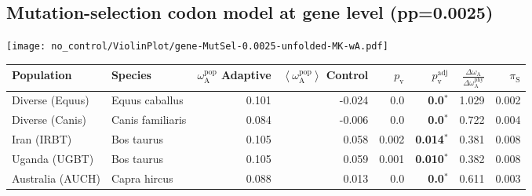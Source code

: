 \subsection{Mutation-selection codon model at gene level (pp=0.0025)}
\begin{center}
\texttt{[image: no\_control/ViolinPlot/gene-MutSel-0.0025-unfolded-MK-wA.pdf]}
\begin{adjustbox}{width = 1\textwidth}
\begin{tabular}{|l|l|r|r|r|r|r|r|}
\toprule
                     Population &              Species & \specialcell{$\omega_{\mathrm{A}}^{\mathrm{pop}}$ \\ Adaptive} & \specialcell{$\left< \omega_{\mathrm{A}}^{\mathrm{pop}} \right>$ \\ Control} & $p_{\mathrm{v}}$ & $p_{\mathrm{v}}^{\mathrm{adj}}$ & $\frac{\Delta\omega_{\mathrm{A}}}{\Delta\omega_{\mathrm{A}}^{\mathrm{phy}}}$ & $\pi_{\textrm{S}}$ \\
\midrule
                Diverse (Equus) &       Equus caballus &                                              0.101 &                                             -0.024 &              0.0 &                    \textbf{0.0}$\bm{^*}$ &                                              1.029 &              0.002 \\
                Diverse (Canis) &     Canis familiaris &                                              0.084 &                                             -0.006 &              0.0 &                    \textbf{0.0}$\bm{^*}$ &                                              0.722 &              0.004 \\
                    Iran (IRBT) &           Bos taurus &                                              0.105 &                                              0.058 &            0.002 &                  \textbf{0.014}$\bm{^*}$ &                                              0.381 &              0.008 \\
                  Uganda (UGBT) &           Bos taurus &                                              0.105 &                                              0.059 &            0.001 &                  \textbf{0.010}$\bm{^*}$ &                                              0.382 &              0.008 \\
               Australia (AUCH) &         Capra hircus &                                              0.088 &                                              0.013 &              0.0 &                    \textbf{0.0}$\bm{^*}$ &                                              0.611 &              0.003 \\

\end{tabular}
\end{adjustbox}
\end{center}
